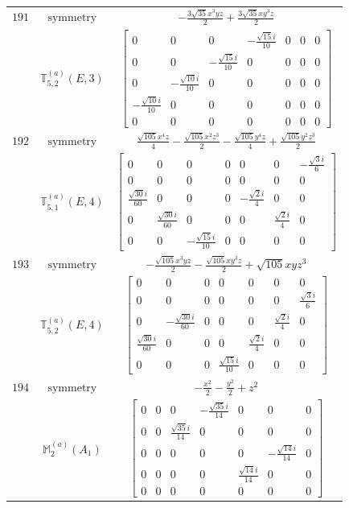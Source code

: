 \documentclass[fleqn,8pt,landscape]{jsarticle}
\begin{document}
\begin{longtable}{ccc}
$ 191 $ & $ \text{symmetry} $ & $ - \frac{3 \sqrt{35} x^{3} y z}{2} + \frac{3 \sqrt{35} x y^{3} z}{2} $ \\
$  $ & $ \mathbb{T}_{5,2}^{(a)}(E,3) $ & $ \begin{bmatrix} 0 & 0 & 0 & - \frac{\sqrt{15} i}{10} & 0 & 0 & 0 \\ 0 & 0 & - \frac{\sqrt{15} i}{10} & 0 & 0 & 0 & 0 \\ 0 & - \frac{\sqrt{10} i}{10} & 0 & 0 & 0 & 0 & 0 \\ - \frac{\sqrt{10} i}{10} & 0 & 0 & 0 & 0 & 0 & 0 \\ 0 & 0 & 0 & 0 & 0 & 0 & 0 \end{bmatrix} $ \\ \hline
$ 192 $ & $ \text{symmetry} $ & $ \frac{\sqrt{105} x^{4} z}{4} - \frac{\sqrt{105} x^{2} z^{3}}{2} - \frac{\sqrt{105} y^{4} z}{4} + \frac{\sqrt{105} y^{2} z^{3}}{2} $ \\
$  $ & $ \mathbb{T}_{5,1}^{(a)}(E,4) $ & $ \begin{bmatrix} 0 & 0 & 0 & 0 & 0 & 0 & - \frac{\sqrt{3} i}{6} \\ 0 & 0 & 0 & 0 & 0 & 0 & 0 \\ \frac{\sqrt{30} i}{60} & 0 & 0 & 0 & - \frac{\sqrt{2} i}{4} & 0 & 0 \\ 0 & \frac{\sqrt{30} i}{60} & 0 & 0 & 0 & \frac{\sqrt{2} i}{4} & 0 \\ 0 & 0 & - \frac{\sqrt{15} i}{10} & 0 & 0 & 0 & 0 \end{bmatrix} $ \\ \hline
$ 193 $ & $ \text{symmetry} $ & $ - \frac{\sqrt{105} x^{3} y z}{2} - \frac{\sqrt{105} x y^{3} z}{2} + \sqrt{105} x y z^{3} $ \\
$  $ & $ \mathbb{T}_{5,2}^{(a)}(E,4) $ & $ \begin{bmatrix} 0 & 0 & 0 & 0 & 0 & 0 & 0 \\ 0 & 0 & 0 & 0 & 0 & 0 & \frac{\sqrt{3} i}{6} \\ 0 & - \frac{\sqrt{30} i}{60} & 0 & 0 & 0 & \frac{\sqrt{2} i}{4} & 0 \\ \frac{\sqrt{30} i}{60} & 0 & 0 & 0 & \frac{\sqrt{2} i}{4} & 0 & 0 \\ 0 & 0 & 0 & \frac{\sqrt{15} i}{10} & 0 & 0 & 0 \end{bmatrix} $ \\ \hline
$ 194 $ & $ \text{symmetry} $ & $ - \frac{x^{2}}{2} - \frac{y^{2}}{2} + z^{2} $ \\
$  $ & $ \mathbb{M}_{2}^{(a)}(A_{1}) $ & $ \begin{bmatrix} 0 & 0 & 0 & - \frac{\sqrt{35} i}{14} & 0 & 0 & 0 \\ 0 & 0 & \frac{\sqrt{35} i}{14} & 0 & 0 & 0 & 0 \\ 0 & 0 & 0 & 0 & 0 & - \frac{\sqrt{14} i}{14} & 0 \\ 0 & 0 & 0 & 0 & \frac{\sqrt{14} i}{14} & 0 & 0 \\ 0 & 0 & 0 & 0 & 0 & 0 & 0 \end{bmatrix} $ \\ \hline

\end{longtable}
\end{document}
